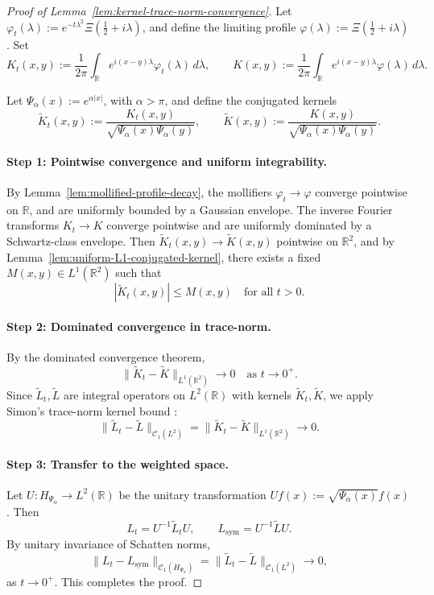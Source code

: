 \begin{proof}[Proof of Lemma~\ref{lem:kernel-trace-norm-convergence}]
Let \( \varphi_t(\lambda) := e^{-t\lambda^2} \Xi\left(\tfrac{1}{2} + i\lambda\right) \), and define the limiting profile \( \varphi(\lambda) := \Xi\left(\tfrac{1}{2} + i\lambda\right) \). Set
\[
K_t(x,y) := \frac{1}{2\pi} \int_{\mathbb{R}} e^{i(x - y)\lambda} \varphi_t(\lambda)\, d\lambda, \qquad
K(x,y) := \frac{1}{2\pi} \int_{\mathbb{R}} e^{i(x - y)\lambda} \varphi(\lambda)\, d\lambda.
\]

Let \( \Psi_\alpha(x) := e^{\alpha |x|} \), with \( \alpha > \pi \), and define the conjugated kernels
\[
\widetilde{K}_t(x,y) := \frac{K_t(x,y)}{\sqrt{\Psi_\alpha(x)\Psi_\alpha(y)}}, \qquad
\widetilde{K}(x,y) := \frac{K(x,y)}{\sqrt{\Psi_\alpha(x)\Psi_\alpha(y)}}.
\]

\paragraph{Step 1: Pointwise convergence and uniform integrability.}
By Lemma~\ref{lem:mollified-profile-decay}, the mollifiers \( \varphi_t \to \varphi \) converge pointwise on \( \mathbb{R} \), and are uniformly bounded by a Gaussian envelope. The inverse Fourier transforms \( K_t \to K \) converge pointwise and are uniformly dominated by a Schwartz-class envelope. Then \( \widetilde{K}_t(x,y) \to \widetilde{K}(x,y) \) pointwise on \( \mathbb{R}^2 \), and by Lemma~\ref{lem:uniform-L1-conjugated-kernel}, there exists a fixed \( M(x,y) \in L^1(\mathbb{R}^2) \) such that
\[
|\widetilde{K}_t(x,y)| \le M(x,y) \quad \text{for all } t > 0.
\]

\paragraph{Step 2: Dominated convergence in trace-norm.}
By the dominated convergence theorem,
\[
\| \widetilde{K}_t - \widetilde{K} \|_{L^1(\mathbb{R}^2)} \to 0 \quad \text{as } t \to 0^+.
\]
Since \( \widetilde{L}_t, \widetilde{L} \) are integral operators on \( L^2(\mathbb{R}) \) with kernels \( \widetilde{K}_t, \widetilde{K} \), we apply Simon’s trace-norm kernel bound \cite[Theorem~3.1]{Simon2005TraceIdeals}:
\[
\| \widetilde{L}_t - \widetilde{L} \|_{\mathcal{C}_1(L^2)} = \| \widetilde{K}_t - \widetilde{K} \|_{L^1(\mathbb{R}^2)} \to 0.
\]

\paragraph{Step 3: Transfer to the weighted space.}
Let \( U \colon H_{\Psi_\alpha} \to L^2(\mathbb{R}) \) be the unitary transformation \( Uf(x) := \sqrt{\Psi_\alpha(x)} f(x) \). Then
\[
L_t = U^{-1} \widetilde{L}_t U, \qquad L_{\mathrm{sym}} = U^{-1} \widetilde{L} U.
\]
By unitary invariance of Schatten norms,
\[
\| L_t - L_{\mathrm{sym}} \|_{\mathcal{C}_1(H_{\Psi_\alpha})} = \| \widetilde{L}_t - \widetilde{L} \|_{\mathcal{C}_1(L^2)} \to 0,
\]
as \( t \to 0^+ \). This completes the proof.
\end{proof}
%  